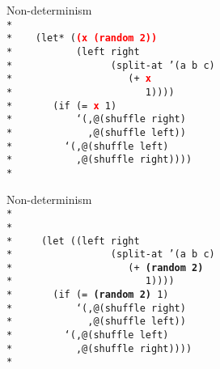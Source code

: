 \begin{frame}{Non-determinism}
  \texttt{
    \ \\*
    \ \\*
    \ \ \ (let* (\textbf{\textcolor{red}{(x (random 2))}}\\*
    \ \ \ \ \ \ \ \ \ \ (left right\\*
    \ \ \ \ \ \ \ \ \ \ \ \ \ \ \ \ (split-at '(a b c)\\*
    \ \ \ \ \ \ \ \ \ \ \ \ \ \ \ \ \ \ \ (+ \textbf{\textcolor{red}{x}}\\*
    \ \ \ \ \ \ \ \ \ \ \ \ \ \ \ \ \ \ \ \ \ \ 1))))\\*
    \ \ \ \ \ \ (if (= \textbf{\textcolor{red}{x}} 1)\\*
    \ \ \ \ \ \ \ \ \ \ `(,@(shuffle right)\\*
    \ \ \ \ \ \ \ \ \ \ \ \ ,@(shuffle left))\\*
    \ \ \ \ \ \ \ \ `(,@(shuffle left)\\*
    \ \ \ \ \ \ \ \ \ \ ,@(shuffle right))))\\*
    \ 
    }
\end{frame}

\begin{frame}{Non-determinism}
  \texttt{
    \ \\*
    \ \\*
    \ \\*
    \ \ \ \ (let ((left right\\*
    \ \ \ \ \ \ \ \ \ \ \ \ \ \ \ \ (split-at '(a b c)\\*
    \ \ \ \ \ \ \ \ \ \ \ \ \ \ \ \ \ \ \ (+ \textbf{(random 2)}\\*
    \ \ \ \ \ \ \ \ \ \ \ \ \ \ \ \ \ \ \ \ \ \ 1))))\\*
    \ \ \ \ \ \ (if (= \textbf{(random 2)} 1)\\*
    \ \ \ \ \ \ \ \ \ \ `(,@(shuffle right)\\*
    \ \ \ \ \ \ \ \ \ \ \ \ ,@(shuffle left))\\*
    \ \ \ \ \ \ \ \ `(,@(shuffle left)\\*
    \ \ \ \ \ \ \ \ \ \ ,@(shuffle right))))\\*
    \ 
  }
\end{frame}

